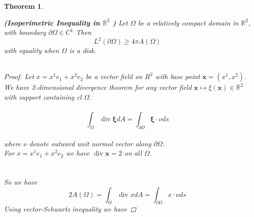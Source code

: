 \documentclass[oneside]{book}
\newtheorem{theorem}{Theorem}[section]
\begin{document}
\begin{theorem}
\label{t:2}

 \textbf{(Isoperimetric Inequality in $\mathbb{R}^{2}$ )} Let $\Omega$ be a relatively compact domain in $\mathbb{R}^{2}$, with boundary $\partial \Omega \in C^{1}$ Then
      \begin{equation}
      \label{eq14}  
   L^{2}(\partial \Omega) \geq 4 \pi A(\Omega) 
      \end{equation}
 with equality when $\Omega$ is a disk.\\\\

\begin{proof}

 Let $x=x^{1} e_{1}+x^{2} e_{2}$ be a vector field on $R^{2}$ with base point $\textbf{x}=\left(x^{1}, x^{2}\right) .$
We have 2-dimensional divergence theorem for any vector
field $\textbf{x} \mapsto \xi(\textbf{x}) \in \mathbb{R}^{2}$ with support containing cl $\Omega$.
\\\\
    \begin{equation}
    \label{eq15}  
\int_{\Omega} \operatorname{div} \boldsymbol{\xi} d A=\int_{\partial \Omega} \boldsymbol{\xi} \cdot \nu d s 
  \end{equation} \\
  
where $\nu$ denote outward unit normal vector along $\partial\Omega$. \\
    
For  $ x=x^{1} e_{1}+x^{2} e_{2}$ we have 
$\operatorname{div} \textbf{x}=2$ on all $\Omega$. 
\\\\\\
So we have
\\
$$ 2 A(\Omega)=\int_{\Omega} \operatorname{div} x d A=\int_{\partial \Omega} x \cdot \nu d s$$ 
Using vector-Schwartz inequality we have 


\end{proof}
\end{theorem}
\end{document}

